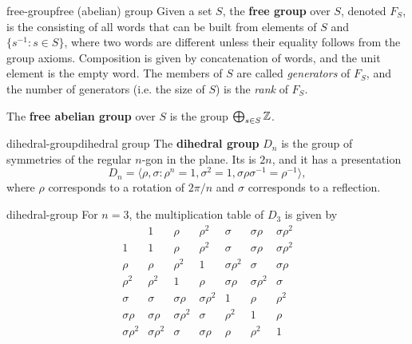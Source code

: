 \begin{topic}{free-group}{free (abelian) group}
    Given a set $S$, the \textbf{free group} over $S$, denoted $F_S$, is the  consisting of all words that can be built from elements of $S$ and $\{ s^{-1} : s \in S \}$, where two words are different unless their equality follows from the group axioms. Composition is given by concatenation of words, and the unit element is the empty word. The members of $S$ are called \textit{generators} of $F_S$, and the number of generators (i.e. the size of $S$) is the \textit{rank} of $F_S$.

    The \textbf{free abelian group} over $S$ is the  group $\bigoplus_{s \in S} \mathbb{Z}$.
\end{topic}

\begin{topic}{dihedral-group}{dihedral group}
    The \textbf{dihedral group} $D_n$ is the group of symmetries of the regular $n$-gon in the plane. Its  is $2n$, and it has a presentation
    \[ D_n = \langle \rho, \sigma : \rho^n = 1, \sigma^2 = 1, \sigma \rho \sigma^{-1} = \rho^{-1} \rangle , \]
    where $\rho$ corresponds to a rotation of $2 \pi / n$ and $\sigma$ corresponds to a reflection.
\end{topic}

\begin{example}{dihedral-group}
    For $n = 3$, the multiplication table of $D_3$ is given by
    \[ \begin{array}{c||c|c|c|c|c|c} 
           & 1 & \rho & \rho^2 & \sigma & \sigma \rho & \sigma \rho^2 \\ \hline \hline
         1 & 1 & \rho & \rho^2 & \sigma & \sigma \rho & \sigma \rho^2 \\ \hline
         \rho & \rho & \rho^2 & 1 & \sigma \rho^2 & \sigma & \sigma \rho \\ \hline
         \rho^2 & \rho^2 & 1 & \rho & \sigma \rho & \sigma \rho^2 & \sigma \\ \hline
         \sigma & \sigma & \sigma \rho & \sigma \rho^2 & 1 & \rho & \rho^2 \\ \hline
         \sigma \rho & \sigma \rho & \sigma \rho^2 & \sigma & \rho^2 & 1 & \rho \\ \hline
         \sigma \rho^2 & \sigma \rho^2 & \sigma & \sigma \rho & \rho & \rho^2 & 1
    \end{array} \]
\end{example}

